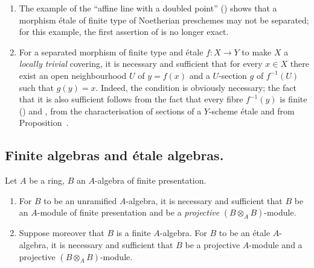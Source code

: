 \begin{remarks}[18.2.10]
\label{IV.18.2.10}
\begin{enumerate}
  \item[(i)] The example of the ``affine line with a doubled point'' () shows that a morphism \'etale of finite type of Noetherian preschemes may not be separated;
for this example, the first assertion of  is no longer exact.

  \item[(ii)] For a separated morphism of finite type and \'etale $f:X\to Y$ to make $X$ a \emph{locally trivial} covering, it is necessary and sufficient that for every $x\in X$ there exist an open neighbourhood $U$ of $y=f(x)$ and a $U$-section $g$ of $f^{-1}(U)$ such that $g(y)=x$.
Indeed, the condition is obviously necessary;
the fact that it is also sufficient follows from the fact that every fibre $f^{-1}(y)$ is finite () and , from the characterisation of sections of a $Y$-scheme \'etale  and from Proposition~.
\end{enumerate}
\end{remarks}


\subsection{Finite algebras and \'etale algebras.}
\label{subsection:IV.18.3}

\begin{proposition}[18.3.1]
\label{IV.18.3.1}
Let $A$ be a ring, $B$ an $A$-algebra of finite presentation.
\begin{enumerate}
  \item[(i)] For $B$ to be an unramified $A$-algebra, it is necessary and sufficient that $B$ be an $A$-module of finite presentation and be a \emph{projective} $(B\otimes_A B)$-module.
  \item[(ii)] Suppose moreover that $B$ is a finite $A$-algebra.  For $B$ to be an \'etale $A$-algebra, it is necessary and sufficient that $B$ be a projective $A$-module and a projective $(B\otimes_A B)$-module.
\end{enumerate}
\end{proposition}

